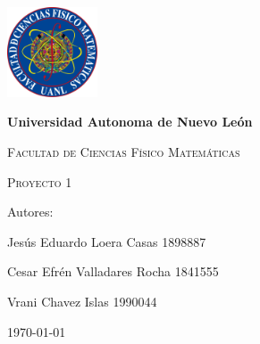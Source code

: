 \begin{titlepage}
    \centering
    {\includegraphics[width=0.2\textwidth]{FCFM.png}\par}
    \vspace{1cm}
    {\bfseries\LARGE Universidad Autonoma de Nuevo León \par}
    \vspace{1cm}
    {\scshape\Large Facultad de Ciencias Físico Matemáticas \par}
    \vspace{3cm}
    {\scshape\Huge Proyecto 1  \par}
    \vspace{3cm}
    {\Large Autores: \par}
    \vfill
    {\Large Jesús Eduardo Loera Casas 1898887 \par}
    \vfill{\Large Cesar Efrén Valladares Rocha 1841555 \par}
    \vfill
    {\Large Vrani Chavez Islas 1990044 \par}
    \vfill
    {\Large \today \par}
\end{titlepage}